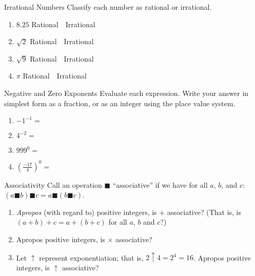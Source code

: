 \documentclass[12pt,letterpaper]{article}
\begin{document}
\begin{problem}{Irrational Numbers}
 Classify each number as rational or irrational.

 \begin{enumerate}[\hspace{.5cm}a.]
  \item $8.25$ \hfill Rational~~Irrational
  \item $\sqrt{2}$ \hfill Rational~~Irrational
  \item $\sqrt{9}$ \hfill Rational~~Irrational
  \item $\pi$ \hfill Rational~~Irrational
 \end{enumerate}
\end{problem}

\begin{problem}{Negative and Zero Exponents}
 Evaluate each expression. Write your answer in simplest form as a fraction, or
 as an integer using the place value system.

 \begin{enumerate}[\hspace{.5cm}a.]
  \item ${-1}^{-1}=$ \hfill\underline{\hspace{3em}}
  \item $4^{-2}=$ \hfill\underline{\hspace{3em}}
  \item ${999}^0=$ \hfill\underline{\hspace{3em}}
  \item ${\left(\frac{-17}{4}\right)}^0=$ \hfill\underline{\hspace{3em}}
 \end{enumerate}
\end{problem}

\begin{problem}{Associativity}
 Call an operation $\blacksquare$ ``associative'' if we have for all $a$, $b$,
 and $c$: $(a \blacksquare b) \blacksquare c = a \blacksquare (b \blacksquare
 c)$.

 \begin{enumerate}[\hspace{.5cm}a.]
  \item \emph{Apropos} (with regard to) positive integers, is $+$ associative?
  (That is, is $(a+b)+c=a+(b+c)$ for all $a$, $b$ and $c$?)
  \item Apropos positive integers, is $\times$ associative?
  \item Let $\uparrow$ represent exponentiation; that is, $2\uparrow4=2^4=16$.
  Apropos positive integers, is $\uparrow$ associative?
 \end{enumerate}
\end{problem}
\end{document}
